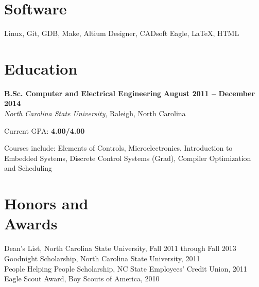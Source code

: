 \documentclass[margin,line,letterpaper]{resume}
\begin{document}
\begin{resume}
    \section{\mysidestyle Software}
    Linux, Git, GDB, Make, Altium Designer, CADsoft Eagle, \LaTeX, HTML

    \section{\mysidestyle Education}

    \textbf{B.Sc. Computer and Electrical Engineering} \hfill \textbf{August 2011 -- December 2014} \vspace{1mm}\\\vspace{1mm}%
    \textsl{North Carolina State University}, Raleigh, North Carolina\vspace{-3mm}\\\vspace{-1mm}%
    \begin{list2}
        \item Current GPA: \textbf{4.00/4.00}
        \item Courses include: Elements of Controls, Microelectronics, Introduction to Embedded Systems,
            Discrete Control Systems (Grad), Compiler Optimization and Scheduling
    \end{list2}\vspace{-1.5mm}


    \section{\mysidestyle Honors and\\Awards}

    Dean's List, North Carolina State University, Fall 2011 through Fall 2013   \vspace{-8mm}\\%

    Goodnight Scholarship, North Carolina State University, 2011              \vspace{-8mm}\\%

    People Helping People Scholarship, NC State Employees' Credit Union, 2011 \vspace{-8mm}\\%

    Eagle Scout Award, Boy Scouts of America, 2010


\end{resume}
\end{document}

